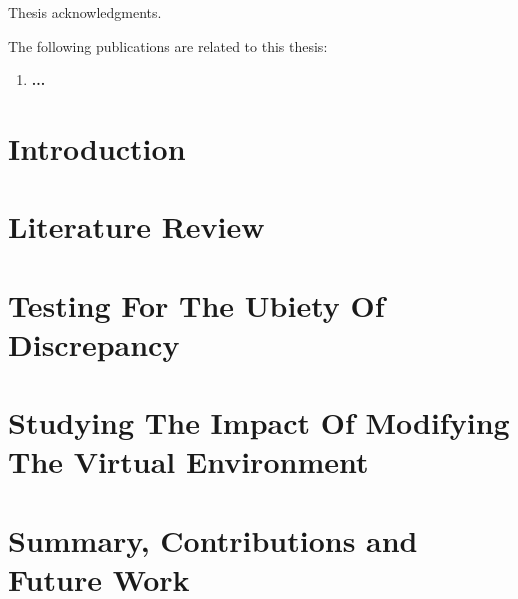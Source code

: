 \documentclass[12pt]{report}
\begin{document}
\begin{acknowledgments}

Thesis acknowledgments.

\end{acknowledgments}

\begin{publications}

The following publications are related to this thesis:

\begin{enumerate}

\item \textbf{...} 

\end{enumerate}

\end{publications}

\chapter{Introduction}
\label{introduction}


\chapter{Literature Review}
\label{literature_review}


\chapter{Testing For The Ubiety Of Discrepancy}
\label{chapter3}


\chapter{Studying The Impact Of Modifying The Virtual Environment}
\label{chapter4}


\chapter{Summary, Contributions and Future Work}
\label{conclusion}


  

\end{document}
